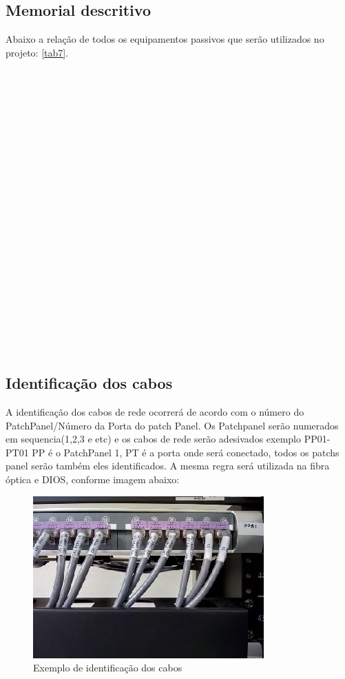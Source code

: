 \documentclass[	DIV=calc,%
							paper=a4,%
							fontsize=12pt,%
							onecolumn]{scrartcl}	 					%
\begin{document}
\subsection{Memorial descritivo}

Abaixo a relação de todos os equipamentos passivos que serão utilizados no projeto:
\ref{tab7}.

\\
\\
\\
\\
\\
\\
\\
\\
\\
\\
\\
\\
\\
\\
\\
\\
\\
\\
\\
\\
\\

\subsection{Identificação dos cabos}
A identificação dos cabos de rede ocorrerá de acordo com o número do PatchPanel/Número da Porta do patch Panel.
Os Patchpanel serão numerados em sequencia(1,2,3 e etc) e os cabos de rede serão adesivados exemplo PP01-PT01 PP é o PatchPanel 1, PT é a porta onde será conectado, todos os patchs panel serão também eles identificados. A mesma regra será utilizada na fibra óptica e DIOS, conforme imagem abaixo:
\begin{figure}
	\centering
	\includegraphics[]{fig12}
	\caption{Exemplo de identificação dos cabos}
	\label{fig12}
\end{figure} 
\end{document}
